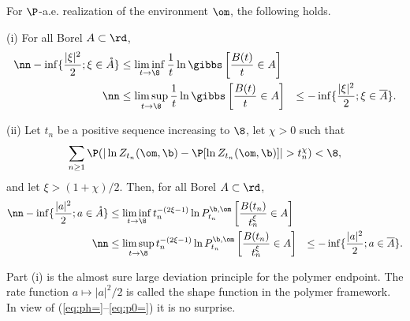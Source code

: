  \begin{theorem} \label{th:LD}
 For $\P$-a.e. realization of the environment $\om$, the following holds.
 \medskip
 
 (i) For all Borel $A \subset \rd$, 
 \begin{eqnarray}\nn
 - \inf \{  \frac{|\xi|^2}{2}; \xi \in \mathring A\} & \leq \liminf_{t \to \8} \frac{1}{t} \ln \gibbs \left[ \frac{B(t)}{t} \in A \right] & \\ \nn
 & \leq \limsup_{t \to \8} \frac{1}{t} \ln \gibbs \left[ \frac{B(t)}{t} \in A \right]  & \leq - \inf \{  \frac{|\xi|^2}{2}; \xi \in \overline A\} . 
\end{eqnarray}
 \medskip
 
 
 (ii)  Let $t_n$ be a positive sequence increasing to $\8$, let $\chi >0$ such that
 \begin{equation} \label{eq:hypMD}
\sum_{n \geq 1} \P( | \ln Z_{t_n}(\om, \b) - \P[\ln Z_{t_n}(\om, \b)] | > t_n^\chi) < \8, 
\end{equation}
and let $\xi > (1+\chi)/2$. Then, for all Borel $A \subset \rd$, 
 \begin{eqnarray}\nn
 - \inf \{  \frac{|a|^2}{2}; a \in \mathring A\} & \leq \liminf_{t \to \8} t_n^{-(2\xi-1)} \ln P_{t_n}^{\b,\om} \left[ \frac{B({t_n})}{t_n^\xi} \in A \right] & \\ \nn
 & \leq \limsup_{t \to \8}  t_n^{-(2\xi-1)} \ln P_{t_n}^{\b,\om} \left[ \frac{B({t_n})}{t_n^\xi} \in A \right]  & \leq - \inf \{  \frac{|a|^2}{2}; a \in \overline A\} . 
\end{eqnarray}
 \end{theorem}
 Part (i) is the almost sure large deviation principle for the polymer endpoint. The rate function $a \mapsto |a|^2/2$ is called the shape function in the polymer framework.
 In view of (\ref{eq:ph=}--\ref{eq:p0=}) it is no surprise. 
 

